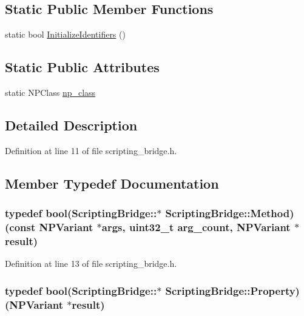 \subsection*{Static Public Member Functions}
\begin{DoxyCompactItemize}
\item 
static bool \hyperlink{class_scripting_bridge_a744b9ecf0b3f4a39aa51c85b1ee5d5e9}{InitializeIdentifiers} ()
\end{DoxyCompactItemize}
\subsection*{Static Public Attributes}
\begin{DoxyCompactItemize}
\item 
static NPClass \hyperlink{class_scripting_bridge_a4fcbbbaf7a6d91a2766066fa2cb2236b}{np\_\-class}
\end{DoxyCompactItemize}


\subsection{Detailed Description}


Definition at line 11 of file scripting\_\-bridge.h.



\subsection{Member Typedef Documentation}
\hypertarget{class_scripting_bridge_a53de202658094d3663f4c330bb096291}{
\subsubsection[{Method}]{\setlength{\rightskip}{0pt plus 5cm}typedef bool(ScriptingBridge::$\ast$ {\bf ScriptingBridge::Method})(const NPVariant $\ast$args, uint32\_\-t arg\_\-count, NPVariant $\ast$result)}}
\label{class_scripting_bridge_a53de202658094d3663f4c330bb096291}


Definition at line 13 of file scripting\_\-bridge.h.

\hypertarget{class_scripting_bridge_afe9032a0f312e1f440f8fed19ffe64d7}{
\subsubsection[{Property}]{\setlength{\rightskip}{0pt plus 5cm}typedef bool(ScriptingBridge::$\ast$ {\bf ScriptingBridge::Property})(NPVariant $\ast$result)}}
\label{class_scripting_bridge_afe9032a0f312e1f440f8fed19ffe64d7}


